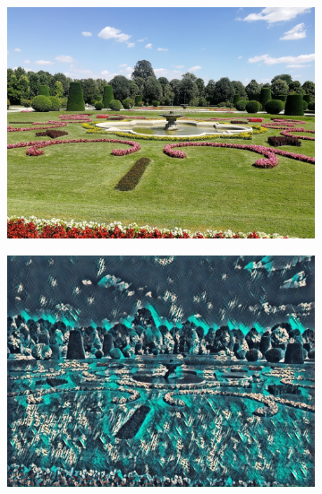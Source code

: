 \begin{figure}[H]
    \begin{subfigure}[h]{0.32\textwidth}
        \centering
        \includegraphics[width=\textwidth]{resources/content/content/garden.jpg}
    \end{subfigure}
    \begin{subfigure}[h]{0.32\textwidth}
        \centering
        \includegraphics[width=\textwidth]{resources/content/experiments/garden-vgg16_teal_and_black_abstract_painting.jpg}
    \end{subfigure}
    \begin{subfigure}[h]{0.32\textwidth}
        \centering

\end{subfigure}
\end{figure}
